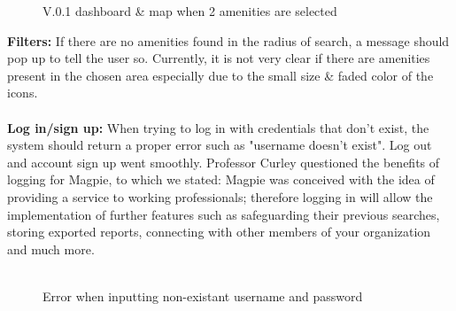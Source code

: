 \begin{figure}
    \caption{V.0.1 dashboard \& map when 2 amenities are selected}
\end{figure}

\textbf{Filters: }
If there are no amenities found in the radius of search, a message should pop up to tell the user so. Currently, it is not very clear if there are amenities present in the chosen area especially due to the small size \& faded color of the icons. \\ \\
\textbf{Log in/sign up: }
When trying to log in with credentials that don't exist, the system should return a proper error such as "username doesn't exist". Log out and account sign up went smoothly. Professor Curley questioned the benefits of logging for Magpie, to which we stated:
Magpie was conceived with the idea of providing a service to working professionals; therefore logging in will allow the implementation of further features such as safeguarding their previous searches, storing exported reports, connecting with other members of your organization and much more.\\ \\

\begin{figure}
    \centering
    \caption{Error when inputting non-existant username and password}
\end{figure}

